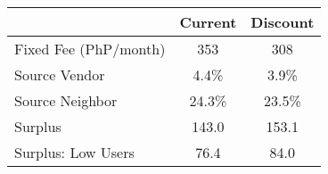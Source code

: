 \begin{tabular}{lcc}
& Current &  Discount \\
\hline
Fixed Fee (PhP/month) &353&308\\
Source Vendor &4.4\% &3.9\% \\
Source Neighbor &24.3\% &23.5\% \\
 Surplus  &143.0&153.1 \\
 Surplus: Low Users  &76.4&84.0 \\
\hline
\end{tabular}
